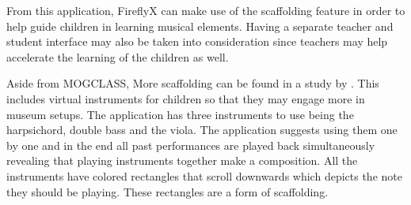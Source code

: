 

From this application, FireflyX can make use of the scaffolding feature in order to help guide children in learning musical elements. Having a separate teacher and student interface may also be taken into consideration since teachers may help accelerate the learning of the children as well. 


Aside from MOGCLASS, More scaffolding can be found in a study by . This includes virtual instruments for children so that they may engage more in museum setups. The application has three instruments to use being the harpsichord, double bass and the viola. The application suggests using them one by one and in the end all past performances are played back simultaneously revealing that playing instruments together make a composition. All the instruments have colored rectangles that scroll downwards which depicts the note they should be playing. These rectangles are a form of scaffolding.

